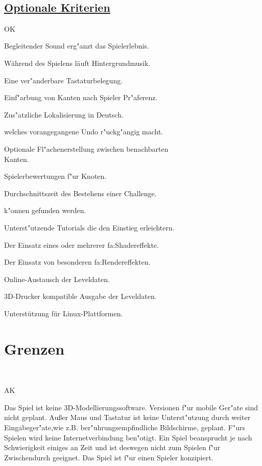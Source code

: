 ~\\


\subsection*{\underline{Optionale Kriterien}}

\begin{ids}{\gls{OK}}


\id[10] Begleitender Sound erg{"a}nzt das Spielerlebnis.

\id[20] Während des Spielens läuft Hintergrundmusik.

\id[30] Eine ver{"a}nderbare Tastaturbelegung.

\id[40] Einf{"a}rbung von Kanten nach Spieler Pr{"a}ferenz.

\id[50] Zus{"a}tzliche Lokalisierung in Deutsch.

 welches vorangegangene Undo r{"u}ckg{"a}ngig macht.

\id[70] Optionale Fl{"a}chenerstellung zwischen benachbarten \\Kanten.

\id[90] Spielerbewertungen f{"u}r Knoten.

\id[100] Durchschnittszeit des Bestehens einer Challenge.

 k{"o}nnen gefunden werden.

\id[120] Unterst{"u}tzende Tutorials die den Einstieg erleichtern.
	
\id[130] Der Einsatz eines oder mehrerer \gls{fa:Shadereffekte}.

\id[140] Der Einsatz von besonderen \gls{fa:Rendereffekte}n.

\id[150] Online-Austausch der Leveldaten.

\id[160] 3D-Drucker kompatible Ausgabe der Leveldaten.

\id[170] Unterstützung für Linux-Plattformen.

\end{ids}


%
%
\clearpage


\section{Grenzen}
\label{UF:Grenzen}

~\\

\begin{ids}{\gls{AK}}

	
	\id[10] Das Spiel ist keine 3D-Modellierungssoftware.
	\id[20] Versionen f{"u}r mobile Ger{"a}te sind nicht geplant.
	\id[20] Außer Maus und Tastatur ist keine Unterst{"u}tzung durch weiter Eingabeger{"a}te,wie z.B.  ber{"u}hrungsempfindliche Bildschirme, geplant.
	\id[40]F{"u}rs Spielen wird keine Internetverbindung ben{"o}tigt. 
	\id[50] Ein Spiel beansprucht je nach Schwierigkeit einiges an Zeit und ist deswegen nicht zum Spielen f{"u}r Zwischendurch geeignet.
	\id[60] Das Spiel ist f{"u}r einen Spieler konzipiert.
	
\end{ids}


